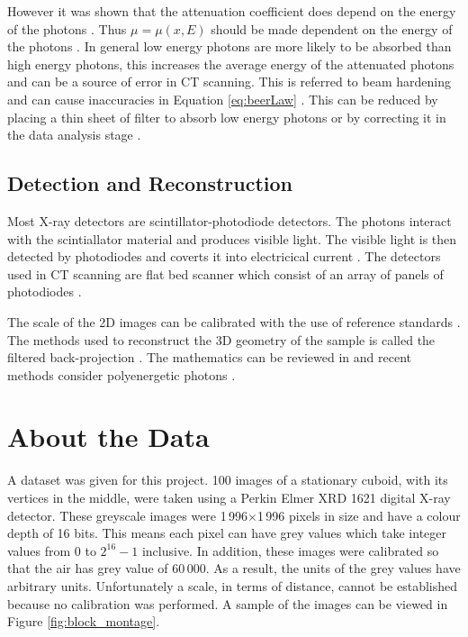 \documentclass[12pt]{report}
\begin{document}
However it was shown that the attenuation coefficient does depend on the energy of the photons \cite{elbakri2002statistical}. Thus $\mu=\mu(x,E)$ should be made dependent on the energy of the photons \cite{cantatore2011introduction}. In general low energy photons are more likely to be absorbed than high energy photons, this increases the average energy of the attenuated photons and can be a source of error in CT scanning. This is referred to beam hardening and can cause inaccuracies in Equation \eqref{eq:beerLaw} \cite{michael2001x}. This can be reduced by placing a thin sheet of filter to absorb low energy photons \cite{welkenhuyzen2009industrial} or by correcting it in the data analysis stage \cite{michael2001x}.

\section{Detection and Reconstruction}
Most X-ray detectors are scintillator-photodiode detectors. The photons interact with the scintiallator material and produces visible light. The visible light is then detected by photodiodes and coverts it into electricical current \cite{michael2001x}. The detectors used in CT scanning are flat bed scanner which consist of an array of panels of photodiodes \cite{cantatore2011introduction}.

The scale of the 2D images can be calibrated with the use of reference standards \cite{bartscher2007enhancement}. The methods used to reconstruct the 3D geometry of the sample is called the filtered back-projection \cite{michael2001x}. The mathematics can be reviewed in \cite{brooks1976principles} and recent methods consider  polyenergetic photons \cite{elbakri2002statistical}.


\chapter{About the Data}

A dataset was given for this project. 100 images of a stationary cuboid, with its vertices in the middle, were taken using a Perkin Elmer XRD 1621 digital X-ray detector. These greyscale images were 1\,996$\times$1\,996 pixels in size and have a colour depth of 16 bits. This means each pixel can have grey values which take integer values from 0 to $2^{16}-1$ inclusive. In addition, these images were calibrated so that the air has grey value of 60\,000. As a result, the units of the grey values have arbitrary units. Unfortunately a scale, in terms of distance, cannot be established because no calibration was performed. A sample of the images can be viewed in Figure \ref{fig:block_montage}.
\end{document}
